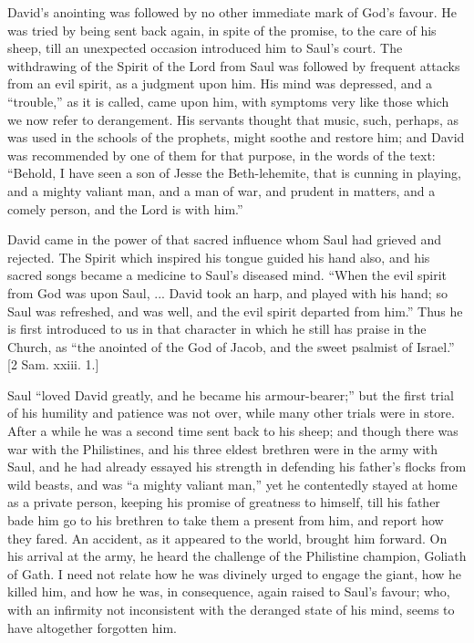 David's anointing was followed by no other immediate mark of God's
favour. He was tried by being sent back again, in spite of the
promise, to the care of his sheep, till an unexpected occasion
introduced him to Saul's court. The withdrawing of the Spirit of the
Lord from Saul was followed by frequent attacks from an evil spirit,
as a judgment upon him. His mind was depressed, and a
``trouble,'' as it is called, came upon him, with symptoms
very like those which we now refer to derangement. His servants
thought that music, such, perhaps, as was used in the schools of the
prophets, might soothe and restore him; and David was recommended by
one of them for that purpose, in the words of the text: ``Behold,
I have seen a son of Jesse the Beth-lehemite, that is cunning in
playing, and a mighty valiant man, and a man of war, and prudent in
matters, and a comely person, and the Lord is with him.''

David came in the power of that sacred influence whom Saul had
grieved and rejected. The Spirit which inspired his tongue guided his
hand also, and his sacred songs became a medicine to Saul's diseased
mind. ``When the evil spirit from God was upon Saul, ... David
took an harp, and played with his hand; so Saul was refreshed, and was
well, and the evil spirit departed from him.'' Thus he is first
introduced to us in that character in which he still has praise in the
Church, as ``the anointed of the God of Jacob, and the sweet
psalmist of Israel.'' [2 Sam. xxiii. 1.]

Saul ``loved David greatly, and he became his armour-bearer;''
but the first trial of his humility and patience was not over, while
many other trials were in store. After a while he was a second time
sent back to his sheep; and though there was war with the Philistines,
and his three eldest brethren were in the army with Saul, and he had
already essayed his strength in defending his father's flocks from
wild beasts, and was ``a mighty valiant man,'' yet he
contentedly stayed at home as a private person, keeping his promise of
greatness to himself, till his father bade him go to his brethren to
take them a present from him, and report how they fared. An accident,
as it appeared to the world, brought him forward. On his arrival at
the army, he heard the challenge of the Philistine champion, Goliath
of Gath. I need not relate how he was divinely urged to engage the
giant, how he killed him, and how he was, in consequence, again raised
to Saul's favour; who, with an infirmity not inconsistent with the
deranged state of his mind, seems to have altogether forgotten him.

